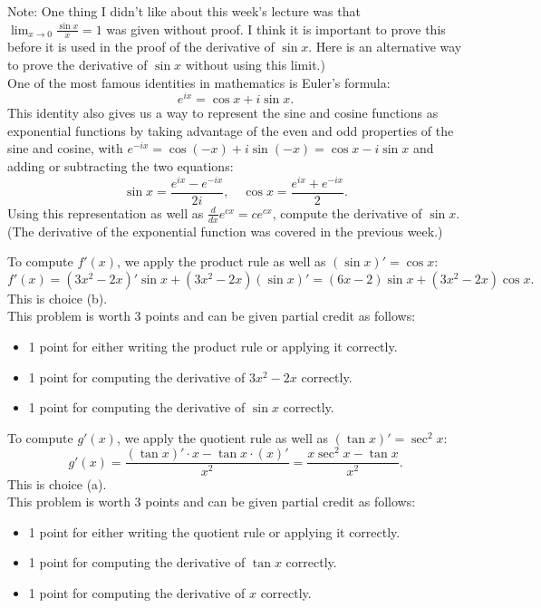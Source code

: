 \documentclass[12pt]{article}
\newenvironment{problem}[2][Problem]{\begin{trivlist}
\item[\hskip \labelsep {\bfseries #1}\hskip \labelsep {\bfseries #2.}]}
{\end{trivlist}}
\begin{document}
\begin{problem}{3} %
(Note: One thing I didn't like about this week's lecture was that\\
$\lim_{x \to 0} \frac{\sin x}{x} = 1$ was given without proof. I think it is 
important to prove this before it is used in the proof of the derivative of 
$\sin x$. Here is an alternative way to prove the derivative of $\sin x$ without
using this limit.)\\
One of the most famous identities in mathematics is Euler's formula:
\[
  e^{ix} = \cos x + i\sin x.
\]
This identity also gives us a way to represent the sine and cosine functions
as exponential functions by taking advantage of the even and odd properties of 
the sine and cosine, with $e^{-ix} = \cos(-x) + i\sin(-x) = \cos x - i\sin x$
and adding or subtracting the two equations:
\[
  \sin x = \frac{e^{ix} - e^{-ix}}{2i}, \quad
  \cos x = \frac{e^{ix} + e^{-ix}}{2}.
\]
Using this representation as well as $\frac{d}{dx}e^{cx} = ce^{cx}$, 
compute the derivative of $\sin x$.\\
(The derivative of the exponential function was covered in the previous week.)
\end{problem}

\pagebreak

\begin{problem}{1 Solution}
To compute $f'(x)$, we apply the product rule as well as $(\sin x)' = \cos x$:
\[
  f'(x) = (3x^2 - 2x)'\sin x + (3x^2 - 2x)(\sin x)' 
  = (6x - 2)\sin x + (3x^2 - 2x)\cos x.
\]
This is choice (b).\\
This problem is worth 3 points and can be given partial credit as follows:
\begin{itemize}
  \item 1 point for either writing the product rule or applying it correctly.
  \item 1 point for computing the derivative of $3x^2 - 2x$ correctly.
  \item 1 point for computing the derivative of $\sin x$ correctly.
\end{itemize}
\end{problem}

\begin{problem}{2 Solution}
To compute $g'(x)$, we apply the quotient rule as well as $(\tan x)' = \sec^2 x$:
\[
  g'(x) = \frac{(\tan x)'\cdot x - \tan x\cdot (x)'}{x^2}
  = \frac{x\sec^2 x - \tan x}{x^2}.
\]
This is choice (a).\\
This problem is worth 3 points and can be given partial credit as follows:
\begin{itemize}
  \item 1 point for either writing the quotient rule or applying it correctly.
  \item 1 point for computing the derivative of $\tan x$ correctly.
  \item 1 point for computing the derivative of $x$ correctly.
\end{itemize}
\end{problem}
\end{document}
